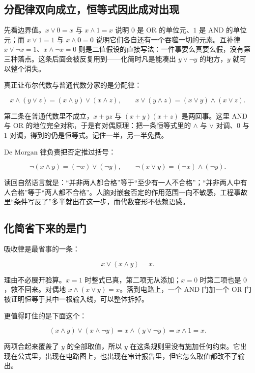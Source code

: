 \subsection{分配律双向成立，恒等式因此成对出现}

先看边界值。\(x\lor0=x\) 与 \(x\land1=x\) 说明 \(0\) 是 OR 的单位元、\(1\) 是 AND 的单位元；而 \(x\lor1=1\) 与 \(x\land0=0\) 说明它们各自还有一个吞噬一切的元素。互补律 \(x\lor\neg x=1\)、\(x\land\neg x=0\) 则是二值假设的直接写法：一件事要么真要么假，没有第三种落点。这条后面会被反复用到——化简时凡是能凑出 \(y\lor\neg y\) 的地方，\(y\) 就可以整个消失。

真正让布尔代数与普通代数分家的是分配律：

\[
x\land(y\lor z)=(x\land y)\lor(x\land z),\qquad
x\lor(y\land z)=(x\lor y)\land(x\lor z).
\]

第二条在普通代数里不成立，\(x+yz\) 与 \((x+y)(x+z)\) 是两回事。这里 AND 与 OR 的地位完全对称，于是有对偶原理：把一条恒等式里的 \(\land\) 与 \(\lor\) 对调、\(0\) 与 \(1\) 对调，得到的仍是恒等式。记住一半，另一半免费。

De Morgan 律负责把否定推过括号：

\[
\neg(x\land y)=(\neg x)\lor(\neg y),\qquad
\neg(x\lor y)=(\neg x)\land(\neg y).
\]

读回自然语言就是：``并非两人都合格''等于``至少有一人不合格''；``并非两人中有人合格''等于``两人都不合格''。人脑对嵌套否定的作用范围一向不敏感，工程事故里``条件写反了''多半就出在这一步，而代数变形不依赖语感。

\subsection{化简省下来的是门}

吸收律是最省事的一条：

\[
x\lor(x\land y)=x.
\]

理由不必展开验算。\(x=1\) 时整式已真，第二项无从添加；\(x=0\) 时第二项也是 \(0\)，救不回来。对偶地 \(x\land(x\lor y)=x\)。落到电路上，一个 AND 门加一个 OR 门被证明恒等于其中一根输入线，可以整体拆掉。

更值得盯住的是下面这个：

\[
(x\land y)\lor(x\land\neg y)=x\land(y\lor\neg y)=x\land1=x.
\]

两项合起来覆盖了 \(y\) 的全部取值，所以 \(y\) 在这条规则里没有施加任何约束。它出现在公式里，出现在电路图上，也出现在审计报告里，但它怎么取值都改不了输出。

